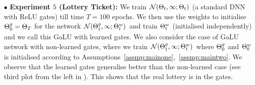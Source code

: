 $\bullet$ \textbf{Experiment $5$ (Lottery Ticket):} We train $\mathcal{N}(\Theta_t,\infty;\Theta_t)$ (a standard DNN with ReLU gates) till time $T=100$ epochs. We then use the weights to initialise ${\Theta}^g_0=\Theta_T$ for the network $\mathcal{N}({\Theta}^g_{\dagger},\infty;{\Theta}^w_t)$ and train ${\Theta}^w_t$ (initialised independently) and we call this GaLU with learned gates. We also consider the case of GaLU network with non-learned gates, where we train $\mathcal{N}({\Theta}^g_{\dagger},\infty;{\Theta}^w_t)$ where ${\Theta}^g_0$ and ${\Theta}^w_0$ is initialised according to Assumptions~\ref{assmp:mainone},~\ref{assmp:maintwo}. We observe that the learned gates generalise better than the non-learned case (see third plot from the left in ). This shows that the real lottery is in the gates.

